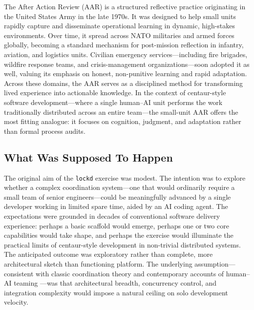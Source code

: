 \documentclass[11pt, a4paper, twocolumn]{article} %
\begin{document}
The After Action Review (AAR) is a structured reflective practice originating in the United States Army in the late 1970s. It was designed to help small units rapidly capture and disseminate operational learning in dynamic, high-stakes environments. Over time, it spread across NATO militaries and armed forces globally, becoming a standard mechanism for post-mission reflection in infantry, aviation, and logistics units. Civilian emergency services---including fire brigades, wildfire response teams, and crisis-management organizations---soon adopted it as well, valuing its emphasis on honest, non-punitive learning and rapid adaptation. Across these domains, the AAR serves as a disciplined method for transforming lived experience into actionable knowledge. In the context of centaur-style software development---where a single human–AI unit performs the work traditionally distributed across an entire team---the small-unit AAR offers the most fitting analogue: it focuses on cognition, judgment, and adaptation rather than formal process audits.

\subsection*{What Was Supposed To Happen}

The original aim of the \texttt{lockd} exercise was modest. The intention was to explore whether a complex coordination system---one that would ordinarily require a small team of senior engineers---could be meaningfully advanced by a single developer working in limited spare time, aided by an AI coding agent. The expectations were grounded in decades of conventional software delivery experience: perhaps a basic scaffold would emerge, perhaps one or two core capabilities would take shape, and perhaps the exercise would illuminate the practical limits of centaur-style development in non-trivial distributed systems. The anticipated outcome was exploratory rather than complete, more architectural sketch than functioning platform. The underlying assumption---consistent with classic coordination theory \citep{brooks1995mythical, conway1968how} and contemporary accounts of human–AI teaming \citep{seeber2020machines, schmutz2024aiteaming}---was that architectural breadth, concurrency control, and integration complexity would impose a natural ceiling on solo development velocity.

\newpage
\end{document}
